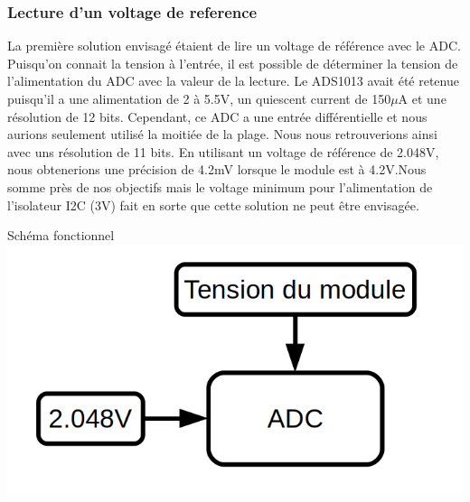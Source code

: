 \documentclass[12pt,letterpaper]{article}
\begin{document}
\begin{normalsize}
				\subsubsection{Lecture d'un voltage de reference}
					La premi\`{e}re solution envisag\'{e} \'{e}taient de lire un voltage de r\'{e}f\'{e}rence avec le ADC. Puisqu'on connait la tension \`{a} l'entr\'{e}e, il est possible de d\'{e}terminer la tension de l'alimentation du ADC avec la valeur de la lecture. Le ADS1013 avait \'{e}t\'{e} retenue puisqu'il a une alimentation de 2 \`{a} 5.5V, un quiescent current de 150$\mu$A et une r\'{e}solution de 12 bits. Cependant, ce ADC a une entr\'{e}e diff\'{e}rentielle et nous aurions seulement utilis\'{e} la moiti\'{e}e de la plage. Nous nous retrouverions ainsi avec uns r\'{e}solution de 11 bits. En utilisant un voltage de r\'{e}f\'{e}rence de 2.048V, nous obtenerions une pr\'{e}cision de 4.2mV lorsque le module est \`{a} 4.2V.Nous somme pr\`{e}s de nos objectifs mais le voltage minimum pour l'alimentation de l'isolateur I2C (3V) fait en sorte que cette solution ne peut \^{e}tre envisag\'{e}e.
					\begin{center}
						Sch\'{e}ma fonctionnel \\ \vspace{0.5cm}
						\includegraphics[scale=0.3]{Voltage_reference} \\ \vspace{1cm}
					\end{center}
				\newpage

\end{normalsize}
\end{document}
